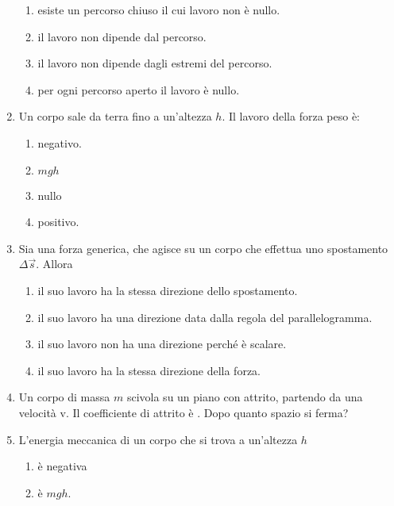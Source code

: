 \documentclass{article}
\begin{document}
\begin{enumerate}
  \begin{enumerate}[label=\Alph*.]
    \item esiste un percorso chiuso il cui lavoro non è nullo.
    \item il lavoro non dipende dal percorso.
    \item il lavoro non dipende dagli estremi del percorso.
    \item per ogni percorso aperto il lavoro è nullo.
  \end{enumerate}
  \item Un corpo sale da terra fino a un'altezza $h$. Il lavoro della forza peso è:
  \begin{enumerate}[label=\Alph*.]
    \item negativo.
    \item $mgh$
    \item nullo
    \item positivo.
  \end{enumerate}
  \item Sia  una forza generica, che agisce su un corpo che effettua uno spostamento $\Delta \vec{s}$. Allora
  \begin{enumerate}[label=\Alph*.]
    \item il suo lavoro ha la stessa direzione dello spostamento.
    \item il suo lavoro ha una direzione data dalla regola del parallelogramma.
    \item il suo lavoro non ha una direzione perché è scalare.
    \item il suo lavoro ha la stessa direzione della forza.
  \end{enumerate}
  \item Un corpo di massa $m$ scivola su un piano con attrito, partendo da una velocità v. Il coefficiente di attrito è \mu. Dopo quanto spazio si ferma?
  \begin{enumerate}[label=\Alph*.]
    \item $\frac{1}{2}v^2+\mu g$.
    \item $\frac{2v^2}{g\mu}}$.
    \item $\frac{v^2}{2g\mu}}$.
    \item $\frac{1}{2}v^2-\mu g$.
  \end{enumerate}
  \item L'energia meccanica di un corpo che si trova a un'altezza $h$
  \begin{enumerate}[label=\Alph*.]
    \item è negativa
    \item è $mgh$.

\end{enumerate}
\end{enumerate}
\end{document}
